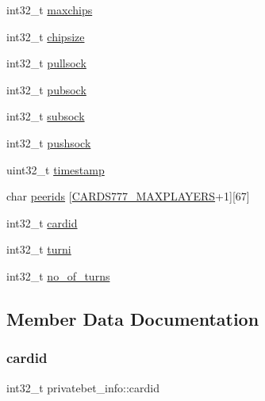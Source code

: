 \begin{DoxyCompactItemize}
\item 
int32\+\_\+t \hyperlink{structprivatebet__info_a195fee78bb1a26504e4920dafea3b195}{maxchips}
\item 
int32\+\_\+t \hyperlink{structprivatebet__info_a1f4c834e20b87839446da22179d2e58b}{chipsize}
\item 
int32\+\_\+t \hyperlink{structprivatebet__info_a5a624f46decb6be461ec1e4edc0cc140}{pullsock}
\item 
int32\+\_\+t \hyperlink{structprivatebet__info_a2443f8a982fb92f3cab78d35d54aeb24}{pubsock}
\item 
int32\+\_\+t \hyperlink{structprivatebet__info_adf0111f2d0328b929100e926427b5ced}{subsock}
\item 
int32\+\_\+t \hyperlink{structprivatebet__info_aa04b8bcf4acf5ced8cfeaa006cc69249}{pushsock}
\item 
uint32\+\_\+t \hyperlink{structprivatebet__info_a41d485812c76258fe86aa2ebb0a43e3b}{timestamp}
\item 
char \hyperlink{structprivatebet__info_a3aa8ce19463aa786e93e92ac4759a6bd}{peerids} \mbox{[}\hyperlink{common_8h_a97d6188fd175f4ea7268e9445107a7c0}{C\+A\+R\+D\+S777\+\_\+\+M\+A\+X\+P\+L\+A\+Y\+E\+RS}+1\mbox{]}\mbox{[}67\mbox{]}
\item 
int32\+\_\+t \hyperlink{structprivatebet__info_ac1a593b6b04f50e52892def22a3fdd53}{cardid}
\item 
int32\+\_\+t \hyperlink{structprivatebet__info_a4a3070b8d22e8ce276a72d45db56353e}{turni}
\item 
int32\+\_\+t \hyperlink{structprivatebet__info_ad37d01428dc307e9deaf5768596e94ef}{no\+\_\+of\+\_\+turns}
\end{DoxyCompactItemize}


\subsection{Member Data Documentation}
\mbox{\label{structprivatebet__info_ac1a593b6b04f50e52892def22a3fdd53}} 
\subsubsection{\texorpdfstring{cardid}{cardid}}
{\footnotesize\ttfamily int32\+\_\+t privatebet\+\_\+info\+::cardid}

\mbox{\label{structprivatebet__info_a8f79ab33689ddb0e10858491ec02a896}} 
